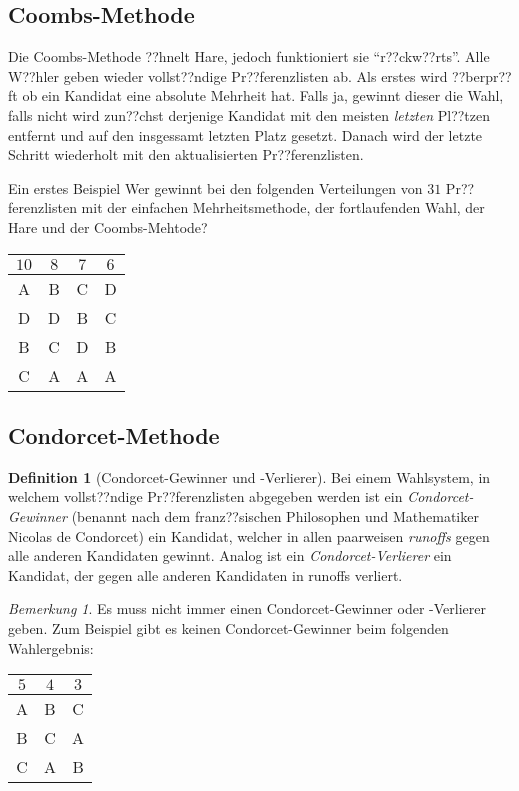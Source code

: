 \documentclass{zirkelblatt1415}
\theoremstyle{definition}
\newtheorem*{definition}{Definition}
\theoremstyle{definition}
\theoremstyle{definition}
\theoremstyle{definition}
\theoremstyle{remark}
\newtheorem*{rmk}{Bemerkung}
\begin{document}
\subsection{Coombs-Methode}

Die Coombs-Methode ??hnelt Hare, jedoch funktioniert sie "`r??ckw??rts"'. Alle W??hler geben wieder vollst??ndige Pr??ferenzlisten ab. Als erstes wird ??berpr??ft ob ein Kandidat eine absolute Mehrheit hat. Falls ja, gewinnt dieser die Wahl, falls nicht wird zun??chst  derjenige Kandidat mit den meisten \emph{letzten} Pl??tzen entfernt und auf den insgessamt letzten Platz gesetzt. Danach wird der letzte Schritt wiederholt mit den aktualisierten Pr??ferenzlisten.

\begin{aufgabe}{Ein erstes Beispiel}
Wer gewinnt bei den folgenden Verteilungen von $31$ Pr??ferenzlisten mit der einfachen Mehrheitsmethode, der fortlaufenden Wahl, der Hare und der Coombs-Mehtode?

\begin{center}
    \begin{tabular}{cccc}
    \toprule
     $10$ & $8$ & $7$ & $6$ \\ \midrule
    A & B & C & D \\[5pt]
    D & D & B & C \\[5pt]
    B & C & D & B \\[5pt]
    C & A & A & A \\
    \bottomrule
    \end{tabular}
\end{center}
\end{aufgabe}

\subsection{Condorcet-Methode}

\begin{definition}[Condorcet-Gewinner und -Verlierer]
Bei einem Wahlsystem, in welchem vollst??ndige Pr??ferenzlisten abgegeben werden ist ein \emph{Condorcet-Gewinner} (benannt nach dem franz??sischen Philosophen und Mathematiker Nicolas de Condorcet) ein Kandidat, welcher in allen paarweisen \emph{runoffs} gegen alle anderen Kandidaten gewinnt. Analog ist ein \emph{Condorcet-Verlierer} ein Kandidat, der gegen alle anderen Kandidaten in runoffs verliert.
\end{definition}

\begin{rmk}
Es muss nicht immer einen Condorcet-Gewinner oder -Verlierer geben. Zum Beispiel gibt es keinen Condorcet-Gewinner beim folgenden Wahlergebnis:
\begin{center}
    \begin{tabular}{ccc}
    \toprule
     $5$ & $4$ & $3$ \\ \midrule
    A & B & C \\[5pt]
    B & C & A \\[5pt]
    C & A & B \\
    \bottomrule
    \end{tabular}
\end{center}
\end{rmk}
\end{document}
